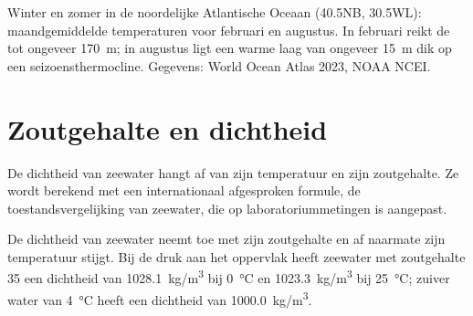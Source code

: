 \begin{omfigure}

{\small Winter en zomer in de noordelijke Atlantische Oceaan (40.5\textdegree NB,
30.5\textdegree WL): maandgemiddelde temperaturen voor februari en augustus.
In februari reikt de  tot ongeveer \qty{170}{m}; in augustus ligt
een warme laag van ongeveer \qty{15}{m} dik op een seizoensthermocline.
Gegevens: World Ocean Atlas 2023, NOAA NCEI.}
\end{omfigure}

\section{Zoutgehalte en dichtheid}

De dichtheid van zeewater hangt af van zijn temperatuur en zijn zoutgehalte. Ze
wordt berekend met een internationaal afgesproken formule, de toestandsvergelijking
van zeewater, die op laboratoriummetingen is aangepast.

\begin{proposition}\label{prop:g10:layered-ocean:density}
De dichtheid van zeewater neemt toe met zijn zoutgehalte en af naarmate zijn
temperatuur stijgt. Bij de druk aan het oppervlak heeft zeewater met zoutgehalte
35 een dichtheid van \qty{1028.1}{kg/m^3} bij \qty{0}{\degreeCelsius} en
\qty{1023.3}{kg/m^3} bij \qty{25}{\degreeCelsius}; zuiver water van
\qty{4}{\degreeCelsius} heeft een dichtheid van \qty{1000.0}{kg/m^3}.
\end{proposition}

